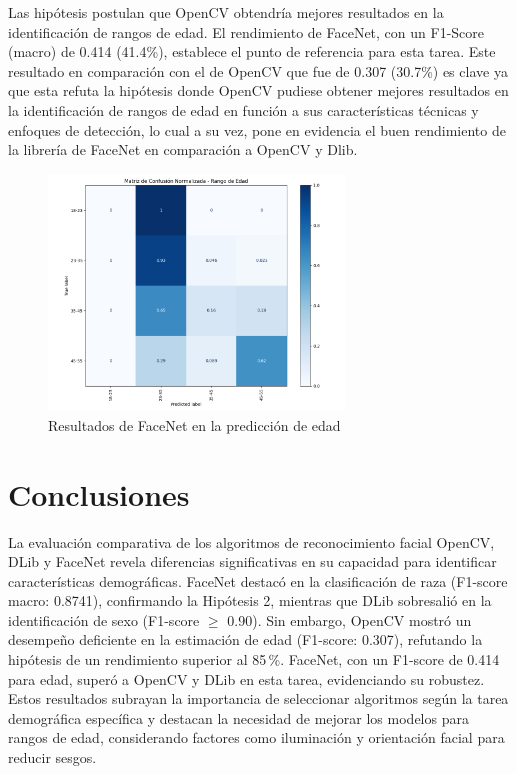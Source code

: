 Las hipótesis postulan que OpenCV obtendría mejores resultados en la identificación de rangos de edad. El rendimiento de FaceNet, con un F1-Score (macro) de 0.414 (41.4\%), establece el punto de referencia para esta tarea. Este resultado en comparación con el de OpenCV que fue de 0.307 (30.7\%) es clave ya que esta refuta la hipótesis donde OpenCV pudiese obtener mejores resultados en la identificación de rangos de edad en función a sus características técnicas y enfoques de detección, lo cual a su vez, pone en evidencia el buen rendimiento de la librería de FaceNet en comparación a OpenCV y Dlib.

\begin{figure}[h]
  \centering
  \includegraphics[width=0.7\textwidth]{assets/MatrizConfusionEdad-facenet.png}
  \caption{Resultados de FaceNet en la predicción de edad}
  \label{fig:facenet_age_results}
\end{figure}
\newpage

\section{Conclusiones}

La evaluación comparativa de los algoritmos de reconocimiento facial OpenCV, DLib y FaceNet revela diferencias significativas en su capacidad para identificar características demográficas. FaceNet destacó en la clasificación de raza (F1-score macro: 0.8741), confirmando la Hipótesis 2, mientras que DLib sobresalió en la identificación de sexo (F1-score $\geq$ 0.90). Sin embargo, OpenCV mostró un desempeño deficiente en la estimación de edad (F1-score: 0.307), refutando la hipótesis de un rendimiento superior al 85\,\%. FaceNet, con un F1-score de 0.414 para edad, superó a OpenCV y DLib en esta tarea, evidenciando su robustez. Estos resultados subrayan la importancia de seleccionar algoritmos según la tarea demográfica específica y destacan la necesidad de mejorar los modelos para rangos de edad, considerando factores como iluminación y orientación facial para reducir sesgos.

